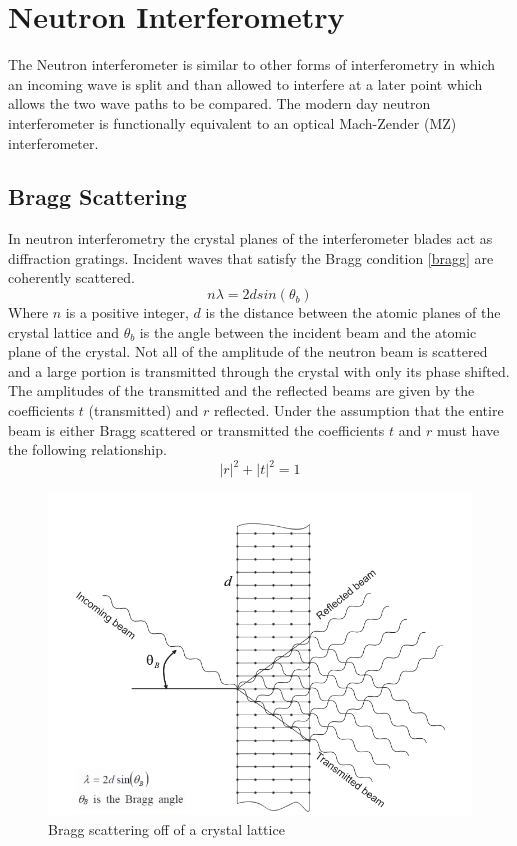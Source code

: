 \section{Neutron Interferometry}
The Neutron interferometer is similar to other forms of interferometry in which an incoming wave is split and than allowed to interfere at a later point which allows the two wave paths to be compared. The modern day neutron interferometer is functionally equivalent to an optical Mach-Zender (MZ) interferometer.\cite{machzehnder}

\subsection{Bragg Scattering}
In neutron interferometry the crystal planes of the interferometer blades act as diffraction gratings. Incident waves that satisfy the Bragg condition \ref{bragg} are coherently scattered.
\begin{equation}
\label{bragg}
n\lambda = 2d sin(\theta_{b})
\end{equation} 
Where $n$ is a positive integer, $d$ is the distance between the atomic planes of the crystal lattice and $\theta_{b}$ is the angle between the incident beam and the atomic plane of the crystal. Not all of the amplitude of the neutron beam is scattered and a large portion is transmitted through the crystal with only its phase shifted. The amplitudes of the transmitted and the reflected beams are given by the coefficients $t$ (transmitted) and $r$ reflected. Under the assumption that the entire beam is either Bragg scattered or transmitted the coefficients $t$ and $r$ must have the following relationship.\cite{dimaThesis}  
\begin{equation}
|r|^2+|t|^2 = 1
\label{eq:BraggCoefficents}
\end{equation}

\begin{figure}[ht!]
\centering
\includegraphics[scale=0.5]{Figures/braggscattering.png}
\caption{Bragg scattering off of a crystal lattice}
\label{fig:braggscattering}
\end{figure}

